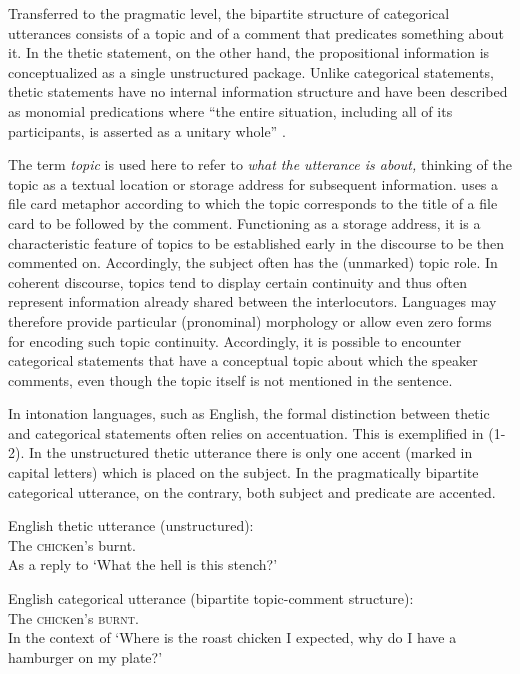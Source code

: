 \documentclass[output=paper]{langsci/langscibook}
\begin{document}
Transferred to the pragmatic level, the bipartite structure of categorical utterances consists of a topic and of a comment that predicates something about it. In the thetic statement, on the other hand, the propositional information is conceptualized as a single unstructured package. Unlike categorical statements, thetic statements have no internal information structure and have been described as monomial predications where “the entire situation, including all of its participants, is asserted as a unitary whole” \citep[4f]{Sasse1995}. 

  The term \textit{topic} is used here to refer to \textit{what the utterance is about,} thinking of the topic as a textual location or storage address for subsequent information. \citet{Reinhart1982} uses a file card metaphor according to which the topic corresponds to the title of a file card to be followed by the comment. Functioning as a storage address, it is a characteristic feature of topics to be established early in the discourse to be then commented on. Accordingly, the subject often has the (unmarked) topic role. In coherent discourse, topics tend to display certain continuity and thus often represent information already shared between the interlocutors. Languages may therefore provide particular (pronominal) morphology or allow even zero forms for encoding such topic continuity. Accordingly, it is possible to encounter categorical statements that have a conceptual topic about which the speaker comments, even though the topic itself is not mentioned in the sentence. 

  In intonation languages, such as English, the formal distinction between thetic and categorical statements often relies on accentuation. This is exemplified in (1-2). In the unstructured thetic utterance there is only one accent (marked in capital letters) which is placed on the subject. In the pragmatically bipartite categorical utterance, on the contrary, both subject and predicate are accented.

\ea
{ English thetic utterance (unstructured):}\\
  The \textsc{chick}en’s burnt. \\
  As a reply to ‘What the hell is this stench?’
\z

\ea
{ English categorical utterance (bipartite topic-comment structure):}\\
  The \textsc{chick}en’s \textsc{burnt}. \\
  In the context of ‘Where is the roast chicken I expected, why do I have a hamburger on my plate?’ \citep[529]{Sasse1987}
\z
\end{document}
